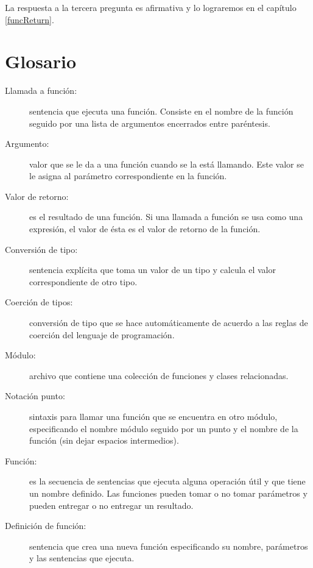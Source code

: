 La respuesta a la tercera pregunta es afirmativa y lo lograremos en el capítulo \ref{funcReturn}.



\section{Glosario}

\begin{description}

\item[Llamada a función:]  sentencia que ejecuta una función. Consiste en el
nombre de la función seguido por una lista de argumentos encerrados entre
paréntesis.

\item[Argumento:]  valor que se le da a una función cuando se la está llamando.
Este valor se le asigna al parámetro correspondiente en la función.

\item[Valor de retorno:]  es el resultado de una función. Si una llamada a función
se usa como una expresión, el valor de ésta es el valor de retorno de la función.

\item[Conversión de tipo:] sentencia explícita que toma un valor
de un tipo y calcula el valor correspondiente de otro tipo.

\item[Coerción de tipos:]  conversión de tipo que se hace automáticamente
de acuerdo a las reglas de coerción del lenguaje de programación.

\item[Módulo:]  archivo que contiene una colección de funciones y clases relacionadas.

\item[Notación punto:] sintaxis para llamar una función que se encuentra en otro
módulo, especificando el nombre módulo seguido por un punto y el nombre de la función
(sin dejar espacios intermedios).

\item[Función:]  es la secuencia de sentencias que ejecuta alguna operación útil y que tiene un nombre definido. 
                Las funciones pueden tomar o no tomar parámetros y pueden entregar o no entregar un resultado.

\item[Definición de función:]  sentencia que crea una nueva función
especificando su nombre, parámetros y las sentencias que ejecuta.


\end{description}
